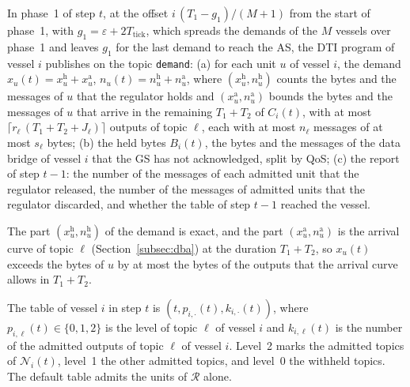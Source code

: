 \begin{definition}\label{def:demand}
In phase~1 of step $t$, at the offset $i\,(T_1 - g_1)/(M+1)$ from the start of phase~1, with $g_1 = \varepsilon + 2T_{\mathrm{tick}}$, which spreads the demands of the $M$ vessels over phase~1 and leaves $g_1$ for the last demand to reach the AS, the DTI program of vessel $i$ publishes on the topic \texttt{demand}:
(a) for each unit $u$ of vessel $i$, the demand $x_u(t) = x^{\mathrm{h}}_u + x^{\mathrm{a}}_u$, $n_u(t) = n^{\mathrm{h}}_u + n^{\mathrm{a}}_u$, where $(x^{\mathrm{h}}_u, n^{\mathrm{h}}_u)$ counts the bytes and the messages of $u$ that the regulator holds and $(x^{\mathrm{a}}_u, n^{\mathrm{a}}_u)$ bounds the bytes and the messages of $u$ that arrive in the remaining $T_1 + T_2$ of $C_i(t)$, with at most $\lceil r_\ell\,(T_1 + T_2 + J_\ell) \rceil$ outputs of topic $\ell$, each with at most $n_\ell$ messages of at most $s_\ell$ bytes;
(b) the held bytes $B_i(t)$, the bytes and the messages of the data bridge of vessel $i$ that the GS has not acknowledged, split by QoS;
(c) the report of step $t-1$: the number of the messages of each admitted unit that the regulator released, the number of the messages of admitted units that the regulator discarded, and whether the table of step $t-1$ reached the vessel.
\end{definition}

The part $(x^{\mathrm{h}}_u, n^{\mathrm{h}}_u)$ of the demand is exact, and the part $(x^{\mathrm{a}}_u, n^{\mathrm{a}}_u)$ is the arrival curve of topic $\ell$ (Section~\ref{subsec:dba}) at the duration $T_1 + T_2$, so $x_u(t)$ exceeds the bytes of $u$ by at most the bytes of the outputs that the arrival curve allows in $T_1 + T_2$.

\begin{definition}\label{def:table}
The table of vessel $i$ in step $t$ is $(t, p_{i,\cdot}(t), k_{i,\cdot}(t))$, where $p_{i,\ell}(t) \in \{0, 1, 2\}$ is the level of topic $\ell$ of vessel $i$ and $k_{i,\ell}(t)$ is the number of the admitted outputs of topic $\ell$ of vessel $i$. Level~2 marks the admitted topics of $\mathcal{N}_i(t)$, level~1 the other admitted topics, and level~0 the withheld topics. The default table admits the units of $\mathcal{R}$ alone.
\end{definition}

